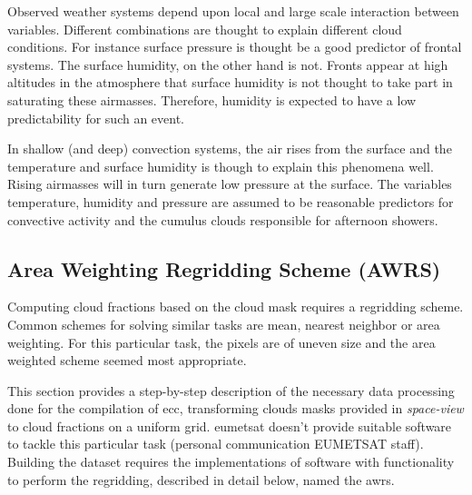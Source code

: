 Observed weather systems depend upon local and large scale interaction between variables. Different combinations are thought to explain different cloud conditions. For instance surface pressure is thought be a good predictor of frontal systems. The surface humidity, on the other hand is not. Fronts appear at high altitudes in the atmosphere that surface humidity is not thought to take part in saturating these airmasses. Therefore, humidity is expected to have a low predictability for such an event. 

In shallow (and deep) convection systems, the air rises from the surface and the temperature and surface humidity is though to explain this phenomena well. Rising airmasses will in turn generate low pressure at the surface. The variables temperature, humidity and pressure are assumed to be reasonable predictors for convective activity and the cumulus clouds responsible for afternoon showers.

\subsection{Area Weighting Regridding Scheme (AWRS)} \label{sec:remapping}
Computing cloud fractions based on the cloud mask requires a regridding scheme. Common schemes for solving similar tasks are mean, nearest neighbor or area weighting. For this particular task, the pixels are of uneven size and the area weighted scheme seemed most appropriate. 

This section provides a step-by-step description of the necessary data processing done for the compilation of \acrshort{ecc}, transforming clouds masks provided in \textit{space-view} to cloud fractions on a uniform grid. \acrshort{eumetsat} doesn't provide suitable software to tackle this particular task (personal communication EUMETSAT staff). Building the dataset requires the implementations of software with functionality to perform the regridding, described in detail below, named the \acrfull{awrs}.

